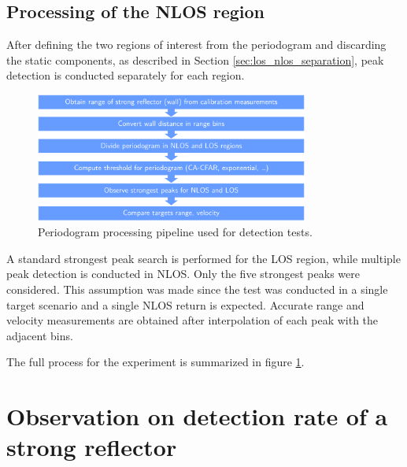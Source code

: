 \subsection{Processing of the NLOS region}

After defining the two regions of interest from the periodogram and discarding the static components, as described in Section \ref{sec:los_nlos_separation}, peak detection is conducted separately for each region. 


\begin{figure}[H]
	\centering
	\includegraphics[width=0.8\textwidth]{Images/Test1/NLOS-proc-pipeline_wide_text12.png}
	\caption{\small Periodogram processing pipeline used for detection tests.}
	\label{fig:Test1_NLOS-proc-pipeline}
\end{figure}

A standard strongest peak search is performed for the LOS region, while multiple peak detection is conducted in NLOS. Only the five strongest peaks were considered. This assumption was made since the test was conducted in a single target scenario and a single NLOS return is expected.
Accurate range and velocity measurements are obtained after interpolation of each peak with the adjacent bins.

The full process for the experiment is summarized in figure \ref{fig:Test1_NLOS-proc-pipeline}.



\section{Observation on detection rate of a strong reflector}

